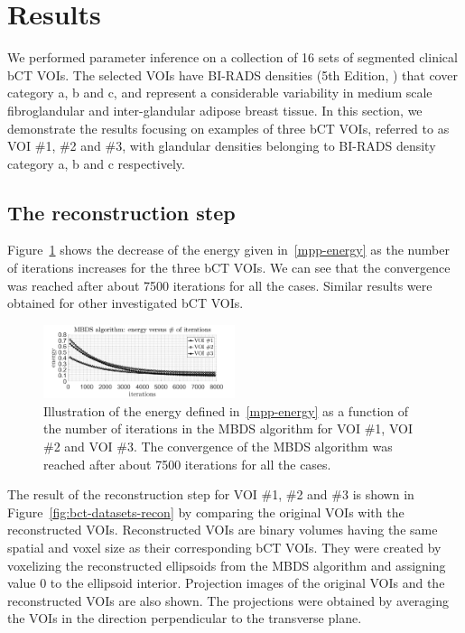 \documentclass[journal]{IEEEtran}
\begin{document}
\section{Results}
\label{sec:results}

We performed parameter inference on a collection of 16 sets of
segmented clinical bCT VOIs. The selected VOIs have BI-RADS densities
(5th Edition, \cite{d2013acr}) that cover category a, b and c, and
represent a considerable variability in medium scale fibroglandular
and inter-glandular adipose breast tissue. In this section, we
demonstrate the results focusing on examples of three bCT VOIs,
referred to as VOI \#1, \#2 and \#3, with glandular densities
belonging to BI-RADS density category a, b and c respectively.

\subsection{The reconstruction step}
\label{sec:reconstruction-step}

Figure~\ref{fig:conv-mbds} shows the decrease of the energy given
in~\eqref{mpp-energy} as the number of iterations increases for the
three bCT VOIs. We can see that the convergence was reached after
about 7500 iterations for all the cases. Similar results were obtained
for other investigated bCT VOIs.

\begin{figure}[!htb]
  \centering \includegraphics[width=0.5\textwidth]
  {figure/convergence_mbds}
  \caption{Illustration of the energy defined in~\eqref{mpp-energy} as
    a function of the number of iterations in the MBDS algorithm for
    VOI \#1, VOI \#2 and VOI \#3. The convergence of the MBDS
    algorithm was reached after about 7500 iterations for all the
    cases.}
  \label{fig:conv-mbds}
\end{figure}

The result of the reconstruction step for VOI \#1, \#2 and \#3 is
shown in Figure~\ref{fig:bct-datasets-recon} by comparing the original
VOIs with the reconstructed VOIs. Reconstructed VOIs are binary
volumes having the same spatial and voxel size as their corresponding
bCT VOIs. They were created by voxelizing the reconstructed ellipsoids
from the MBDS algorithm and assigning value 0 to the ellipsoid
interior. Projection images of the original VOIs and the reconstructed
VOIs are also shown. The projections were obtained by averaging the
VOIs in the direction perpendicular to the transverse plane.
\end{document}
